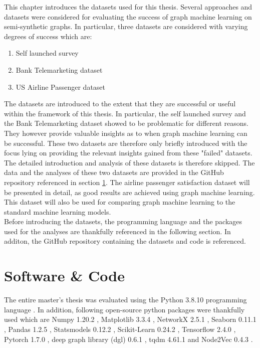   
  This chapter introduces the datasets used for this thesis. Several approaches
  and datasets were considered for evaluating the success of graph machine
  learning on semi-synthetic graphs. In particular, three datasets are 
  considered with varying degrees of success which are:

  \begin{enumerate}
    \item Self launched survey
    \item Bank Telemarketing dataset
    \item US Airline Passenger dataset
  \end{enumerate}

  \noindent The datasets are introduced to the extent that they are successful 
  or useful within the framework of this thesis. In particular, the self 
  launched survey and the Bank Telemarketing dataset showed to be problematic 
  for different reasons. They however provide valuable insights as to when 
  graph machine learning can be successful. These two datasets are therefore 
  only briefly introduced with the focus lying on providing the relevant 
  insights gained from these "failed" datasets. The detailed introduction and
  analysis of these datasets is therefore skipped. The data and the analyses of
  these two datasets are provided in the GitHub repository referenced in
  section \ref{section:software}. The airline passenger satisfaction dataset 
  will be presented in detail, as good results are achieved using graph machine 
  learning. This dataset will also be used for comparing graph machine learning 
  to the standard machine learning models. \\

  \noindent Before introducing the datasets, the programming language and the
   packages used for the analyses are thankfully referenced in the following 
   section. In additon, the GitHub repository containing the datasets and code
   is referenced.

  \section{Software \& Code}
  \label{section:software}

  The entire master's thesis was evaluated using the Python 3.8.10 programming
  language \citep{vanRossum2009}. In addition, following open-source python
  packages were thankfully used which are Numpy 1.20.2 \citep{harris2020array},
  Matplotlib 3.3.4 \citep{Hunter2007}, NetworkX 2.5.1 \citep{hagberg2008exploring}, 
  Seaborn 0.11.1 \citep{Waskom2021}, Pandas 1.2.5 \citep{mckinney2010data}, 
  Statsmodels 0.12.2 \citep{seabold2010statsmodels}, Scikit-Learn 0.24.2 
  \citep{pedregosa2011scikit}, Tensorflow 2.4.0 \citep{abadi2016tensorflow}, 
  Pytorch 1.7.0 \citep{paszke2019pytorch}, deep graph library (dgl) 0.6.1 
  \citep{wang2019deep}, tqdm 4.61.1 \citep{da2021tqdm} and Node2Vec 0.4.3 
  \citep{Cohen2021}. \\

